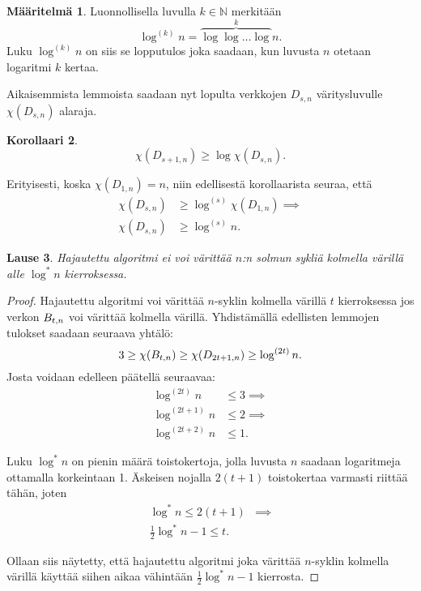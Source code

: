 \documentclass[finnish]{tktltiki2}
\newtheorem{lau}{Lause}
\newtheorem{kor}[lau]{Korollaari}
\theoremstyle{definition}
\newtheorem{maar}[lau]{Määritelmä}
\theoremstyle{remark}
\newcommand{\nat}{\mathbb{N}}
\newcommand{\Dsn}{D_{s,n}}
\newcommand{\Dssn}{D_{s+1,n}}
\begin{document}
\begin{maar}
    Luonnollisella luvulla $k \in \nat$ merkitään
    \begin{equation*}
        \log^{(k)} n = \overbrace{\log \log \dots \log}^{k} n.
    \end{equation*}
    Luku $\log^{(k)} n$ on siis se lopputulos joka saadaan, kun luvusta $n$
    otetaan logaritmi $k$ kertaa.
\end{maar}

Aikaisemmista lemmoista saadaan nyt lopulta verkkojen $\Dsn$ vä\-ri\-tys\-lu\-vul\-le
$\chi(\Dsn)$ alaraja.

\begin{kor}
    \begin{equation*}
        \chi(\Dssn) \geq \log \chi(\Dsn).
    \end{equation*}
\end{kor}

Erityisesti, koska $\chi(D_{1,n}) = n$, niin edellisestä korollaarista seuraa, että
%
\begin{align*}
    \chi(\Dsn) &\geq \log^{(s)} \chi(D_{1,n}) \implies \\
    \chi(\Dsn) &\geq \log^{(s)} n.
\end{align*}

\begin{lau}
    Hajautettu algoritmi ei voi värittää $n$:n solmun sykliä kolmella värillä
    alle $\log^* n$ kierroksessa.
\end{lau}

\begin{proof}
    Hajautettu algoritmi voi värittää $n$-syklin kolmella värillä $t$
    kierroksessa jos verkon $B_{t,n}$ voi värittää kolmella värillä. Yhdistämällä
    edellisten lemmojen tulokset saadaan seuraava yhtälö:
    \begin{equation*}
        3 \geq \chi(B_{t,n}) \geq \chi(D_{2t+1, n}) \geq \log^{(2t)} n.
    \end{equation*}
    Josta voidaan edelleen päätellä seuraavaa:
    \begin{align*}
        \log^{(2t)}   n &\leq 3 \implies \\
        \log^{(2t+1)} n &\leq 2 \implies \\
        \log^{(2t+2)} n &\leq 1.
    \end{align*}

    Luku $\log^* n$ on pienin määrä toistokertoja, jolla luvusta $n$ saadaan
    logaritmeja ottamalla korkeintaan 1. Äskeisen nojalla $2(t+1)$ toistokertaa
    varmasti riittää tähän, joten
    \begin{align*}
        \log^* n \leq 2(t+1)            & \implies \\
        \frac{1}{2} \log^* n - 1 \leq t. &
    \end{align*}

    Ollaan siis näytetty, että hajautettu algoritmi joka värittää $n$-syklin
    kolmella värillä käyttää siihen aikaa vähintään $\frac{1}{2} \log^* n - 1$
    kierrosta.
\end{proof}
\end{document}
